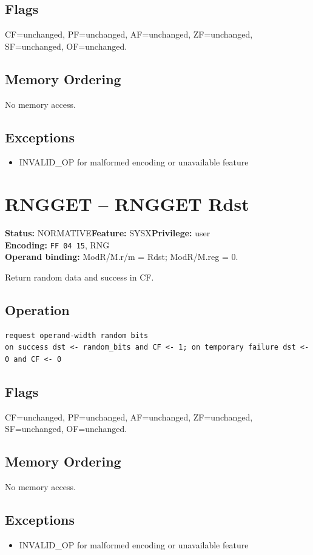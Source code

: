 \documentclass[10pt]{article}
\begin{document}
\subsection*{Flags}
CF=unchanged, PF=unchanged, AF=unchanged, ZF=unchanged, SF=unchanged, OF=unchanged.
\subsection*{Memory Ordering}
No memory access.
\subsection*{Exceptions}
\begin{itemize}
\item INVALID\_OP for malformed encoding or unavailable feature
\end{itemize}
\clearpage

\section{RNGGET -- RNGGET Rdst}
\textbf{Status:} NORMATIVE\quad \textbf{Feature:} SYSX\quad \textbf{Privilege:} user\\
\textbf{Encoding:} \texttt{FF 04 15}, RNG\\
\textbf{Operand binding:} ModR/M.r/m = Rdst; ModR/M.reg = 0.

Return random data and success in CF.

\subsection*{Operation}
\begin{lstlisting}
request operand-width random bits
on success dst <- random_bits and CF <- 1; on temporary failure dst <- 0 and CF <- 0
\end{lstlisting}
\subsection*{Flags}
CF=unchanged, PF=unchanged, AF=unchanged, ZF=unchanged, SF=unchanged, OF=unchanged.
\subsection*{Memory Ordering}
No memory access.
\subsection*{Exceptions}
\begin{itemize}
\item INVALID\_OP for malformed encoding or unavailable feature
\end{itemize}
\clearpage
\end{document}
